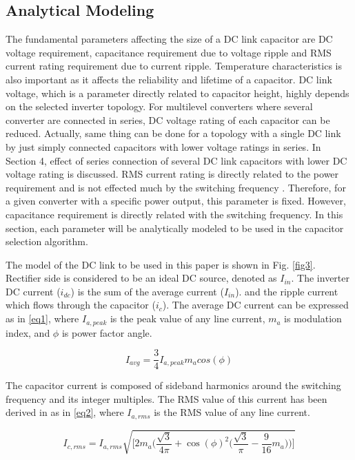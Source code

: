 \documentclass[conference,a4paper,twocolumn]{IEEEtran}
\begin{document}
\subsection{Analytical Modeling}


The fundamental parameters affecting the size of a DC link capacitor are DC voltage requirement, capacitance requirement due to voltage ripple and RMS current rating requirement due to current ripple. Temperature characteristics is also important as it affects the reliability and lifetime of a capacitor. DC link voltage, which is a parameter directly related to capacitor height, highly depends on the selected inverter topology. For multilevel converters where several converter are connected in series, DC voltage rating of each capacitor can be reduced. Actually, same thing can be done for a topology with a single DC link by just simply connected capacitors with lower voltage ratings in series. In Section 4, effect of series connection of several DC link capacitors with lower DC voltage rating is discussed. RMS current rating is directly related to the power requirement and is not effected much by the switching frequency \cite{Wang2013,Wang2015b,Su2010}. Therefore, for a given converter with a specific power output, this parameter is fixed. However, capacitance requirement is directly related with the switching frequency. In this section, each parameter will be analytically modeled to be used in the capacitor selection algorithm.

The model of the DC link to be used in this paper is shown in Fig. \ref{fig3}. Rectifier side is considered to be an ideal DC source, denoted as $I_{in}$. The inverter DC current ($i_{dc}$) is the sum of the average current ($I_{in}$). and the ripple current which flows through the capacitor ($i_c$). The average DC current can be expressed as in \ref{eq1}, where $I_{a,peak}$ is the peak value of any line current, $m_a$ is modulation index, and $\phi$ is power factor angle.

\begin{equation}
\label{eq1}
I_{avg} = \frac{3}{4}I_{a,peak}m_acos(\phi)
\end{equation}


The capacitor current is composed of sideband harmonics around the switching frequency and its integer multiples. The RMS value of this current has been derived in \cite{Su2010,Bianchi2003} as in \ref{eq2}, where $I_{a,rms}$ is the RMS value of any line current.

\begin{equation}
\label{eq2}
I_{c,rms} = I_{a,rms}\sqrt{\bigg[2m_a\Big(\frac{\sqrt{3}}{4\pi}+\cos(\phi)^2\big(\frac{\sqrt{3}}{\pi}-\frac{9}{16}m_a\big)\Big)\bigg]}
\end{equation}
\end{document}

